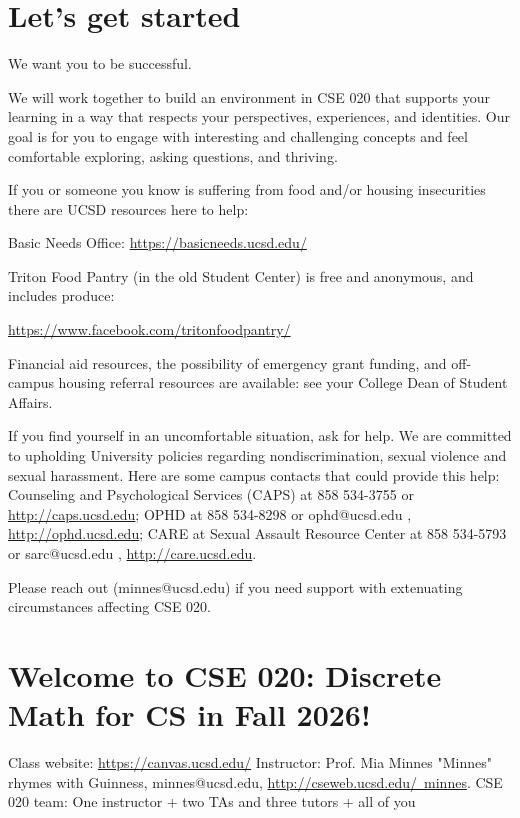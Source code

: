 \documentclass[12pt, oneside]{article}
\begin{document}
\begin{flushright}
\end{flushright} \section*{Let's get started}


We want you to be successful. 

We will work together to build an 
environment in CSE 020 that supports your learning
in a way that respects your
perspectives, experiences, and identities.
Our goal is for you to  engage
with interesting and challenging concepts and 
feel comfortable exploring, asking questions, and thriving.

If you or someone you know is suffering from food and/or housing insecurities 
there are UCSD resources here to help:

Basic Needs Office: \href{https://basicneeds.ucsd.edu/}{https://basicneeds.ucsd.edu/}

Triton Food Pantry (in the old Student Center)
is free and anonymous, and includes produce: 

\href{https://www.facebook.com/tritonfoodpantry/}{https://www.facebook.com/tritonfoodpantry/}

Financial aid resources, the possibility of emergency grant funding, and off-campus housing referral 
resources are available: see your College Dean of Student Affairs.

If you find yourself in an uncomfortable situation, ask for help. 
We are committed to upholding University policies regarding nondiscrimination, sexual violence and sexual harassment.
Here are some campus contacts that could provide this help: 
Counseling and Psychological Services (CAPS) at 858 534-3755 or \href{http://caps.ucsd.edu}{http://caps.ucsd.edu}; 
OPHD at 858 534-8298 or ophd@ucsd.edu , \href{http://ophd.ucsd.edu}{http://ophd.ucsd.edu};
CARE at Sexual Assault Resource Center at 858 534-5793 or sarc@ucsd.edu , \href{http://care.ucsd.edu}{http://care.ucsd.edu}.

Please reach out (minnes@ucsd.edu) if you need support with extenuating circumstances affecting CSE 020.

\vfill

\newpage
\section*{Welcome to CSE 020: Discrete Math for CS in Fall 2026!}
Class website: \href{https://canvas.ucsd.edu//}{https://canvas.ucsd.edu/}
Instructor: Prof. Mia Minnes {\tiny{"Minnes" rhymes with Guinness}}, minnes@ucsd.edu, 
\href{http://cseweb.ucsd.edu/~minnes}{http://cseweb.ucsd.edu/~minnes}.
CSE 020 team: One instructor + two TAs and three tutors + all of you
\end{document}
